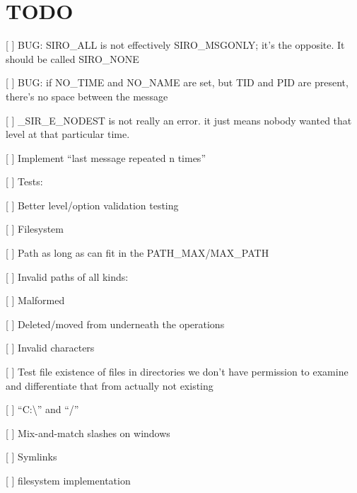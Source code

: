 \chapter{TODO}
\hypertarget{md__t_o_d_o}{}\label{md__t_o_d_o}

\begin{DoxyItemize}
\item \mbox{[} \mbox{]} BUG\+: SIRO\+\_\+\+ALL is not effectively SIRO\+\_\+\+MSGONLY; it’s the opposite. It should be called SIRO\+\_\+\+NONE
\item \mbox{[} \mbox{]} BUG\+: if NO\+\_\+\+TIME and NO\+\_\+\+NAME are set, but TID and PID are present, there’s no space between the message
\item \mbox{[} \mbox{]} \+\_\+\+SIR\+\_\+\+E\+\_\+\+NODEST is not really an error. it just means nobody wanted that level at that particular time.
\item \mbox{[} \mbox{]} Implement “last message repeated n times”
\item \mbox{[} \mbox{]} Tests\+:
\begin{DoxyItemize}
\item \mbox{[} \mbox{]} Better level/option validation testing
\item \mbox{[} \mbox{]} Filesystem
\begin{DoxyItemize}
\item \mbox{[} \mbox{]} Path as long as can fit in the PATH\+\_\+\+MAX/\+MAX\+\_\+\+PATH
\item \mbox{[} \mbox{]} Invalid paths of all kinds\+:
\begin{DoxyItemize}
\item \mbox{[} \mbox{]} Malformed
\item \mbox{[} \mbox{]} Deleted/moved from underneath the operations
\item \mbox{[} \mbox{]} Invalid characters
\item \mbox{[} \mbox{]} Test file existence of files in directories we don’t have permission to examine and differentiate that from actually not existing
\item \mbox{[} \mbox{]} “C\+:\textbackslash{}” and “/”
\item \mbox{[} \mbox{]} Mix-\/and-\/match slashes on windows
\item \mbox{[} \mbox{]} Symlinks
\end{DoxyItemize}
\end{DoxyItemize}
\item \mbox{[} \mbox{]} filesystem implementation
\end{DoxyItemize}

\end{DoxyItemize}
